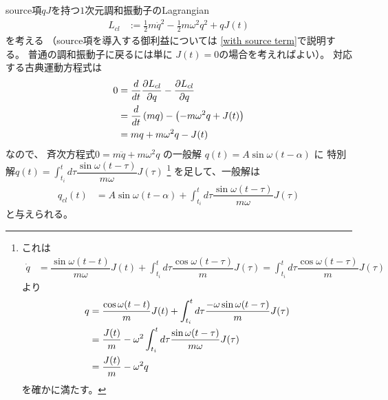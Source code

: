 source項$qJ$を持つ$1$次元調和振動子のLagrangian
\begin{align}
    L_{cl}
    &:=
    \frac{1}{2}m\dot{q}^2
    -
    \frac{1}{2}m\omega^2q^2
    +
    qJ(t)
\label{harmonic oscillator lagrangian with source}
\end{align}
を考える
（source項を導入する御利益については
\ref{with source term}で説明する。
普通の調和振動子に戻るには単に
$J(t) = 0$の場合を考えればよい）。
対応する古典運動方程式は
\begin{align}
    0
    &=
    \frac{d}{dt}
    \frac{\partial L_{cl}}{\partial \dot{q}}
    -
    \frac{\partial L_{cl}}{\partial q}
\notag\\&=
    \frac{d}{dt}
    \left(
        m\dot{q}
    \right)
    -
    \left(
        -
        m\omega^2q
        +
        J(t)
    \right)
\notag\\&=
    m\ddot{q}
    +
    m\omega^2q
    -
    J(t)
\end{align}
なので、
斉次方程式$0 = m \ddot{q} + m \omega^2 q$
の一般解
$q(t) = A \sin \omega (t - \alpha)$
に
特別解$\displaystyle
    q(t) = \int_{t_i}^t
    d\tau
    \dfrac{ \sin \omega (t-\tau) }{
        m \omega
    }
    J(\tau)
$
\footnote{
    これは
    \begin{align}
        \dot{q}
    &=
        \dfrac{ \sin \omega (t-t) }{ m \omega }
        J(t)
        +
        \int_{t_i}^t d\tau
            \dfrac{ \cos \omega (t-\tau) }{ m }
            J(\tau)
    =
        \int_{t_i}^t d\tau
            \dfrac{ \cos \omega (t-\tau) }{ m }
            J(\tau)
    \end{align}
    より
    \begin{align}
        \ddot{q}
        &=
        \dfrac{ \cos \omega (t-t) }{ m }
        J(t)
        +
        \int_{t_i}^t d\tau
        \dfrac{ - \omega \sin \omega (t-\tau) }{m}
        J(\tau)
    \notag\\&=
        \dfrac{J(t)}{m}
        -
        \omega^2\int_{t_i}^t d\tau
        \dfrac{ \sin \omega (t-\tau) }{m \omega}
        J(\tau)
    \notag\\&=
        \dfrac{ J(t) }{m}
        -
        \omega^2 q
    \end{align}
    を確かに満たす。
}
を足して、一般解は
\begin{align}
    q_{cl}(t)
    &=
    A \sin \omega (t-\alpha)
    +
    \int_{t_i}^t d\tau
    \dfrac{ \sin \omega (t-\tau) }{m\omega}
    J(\tau)
\end{align}
と与えられる。

